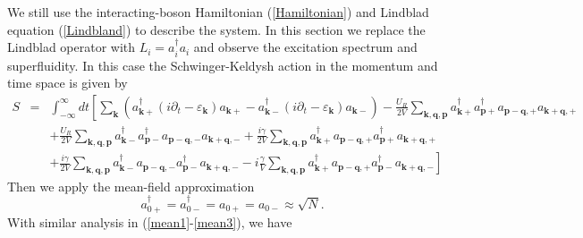 \documentclass{article}
\newcommand{\tmmathbf}[1]{\ensuremath{\boldsymbol{#1}}}
\begin{document}
We still use the interacting-boson Hamiltonian (\ref{Hamiltonian}) and
Lindblad equation (\ref{Lindbland}) to describe the system. In this section we
replace the Lindblad operator with $L_i = a_i^{\dagger} a_i$ and observe the
excitation spectrum and superfluidity. In this case the Schwinger-Keldysh
action in the momentum and time space is given by
\begin{eqnarray}
  S & = & \int_{- \infty}^{\infty} d t \left[ \sum_{\tmmathbf{k}}
  (a^{\dagger}_{\tmmathbf{k}+} (i \partial_t - \varepsilon_{\tmmathbf{k}})
  a_{\tmmathbf{k}+} - a^{\dagger}_{\tmmathbf{k}-} (i \partial_t -
  \varepsilon_{\tmmathbf{k}}) a_{\tmmathbf{k}-}) - \frac{U_R}{2 V}
  \sum_{\tmmathbf{k}, \tmmathbf{q}, \tmmathbf{p}} a_{\tmmathbf{k}+}^{\dagger}
  a_{\tmmathbf{p}+}^{\dagger} a_{\tmmathbf{p}-\tmmathbf{q}, +}
  a_{\tmmathbf{k}+\tmmathbf{q}, +} \right. \nonumber\\
  &  & + \frac{U_R}{2 V} \sum_{\tmmathbf{k}, \tmmathbf{q}, \tmmathbf{p}}
  a_{\tmmathbf{k}-}^{\dagger} a_{\tmmathbf{p}-}^{\dagger}
  a_{\tmmathbf{p}-\tmmathbf{q}, -} a_{\tmmathbf{k}+\tmmathbf{q}, -} + \frac{i
  \gamma}{2 V} \sum_{\tmmathbf{k}, \tmmathbf{q}, \tmmathbf{p}}
  a_{\tmmathbf{k}+}^{\dagger} a_{\tmmathbf{p}-\tmmathbf{q}, +}
  a_{\tmmathbf{p}+}^{\dagger} a_{\tmmathbf{k}+\tmmathbf{q}, +} \nonumber\\
  &  & + \frac{i \gamma}{2 V} \sum_{\tmmathbf{k}, \tmmathbf{q}, \tmmathbf{p}}
  a_{\tmmathbf{k}-}^{\dagger} a_{\tmmathbf{p}-\tmmathbf{q}, -}
  a_{\tmmathbf{p}-}^{\dagger} a_{\tmmathbf{k}+\tmmathbf{q}, -} - i
  \frac{\gamma}{V} \left. \sum_{\tmmathbf{k}, \tmmathbf{q}, \tmmathbf{p}}
  a_{\tmmathbf{k}+}^{\dagger} a_{\tmmathbf{p}-\tmmathbf{q}, +}
  a_{\tmmathbf{p}-}^{\dagger} a_{\tmmathbf{k}+\tmmathbf{q}, -} \right] 
\end{eqnarray}
Then we apply the mean-field approximation
\begin{equation}
  a_{0 +}^{\dagger} = a_{0 -}^{\dagger} = a_{0 +} = a_{0 -} \approx \sqrt{N} .
\end{equation}
With similar analysis in (\ref{mean1}-\ref{mean3}), we have
\end{document}
